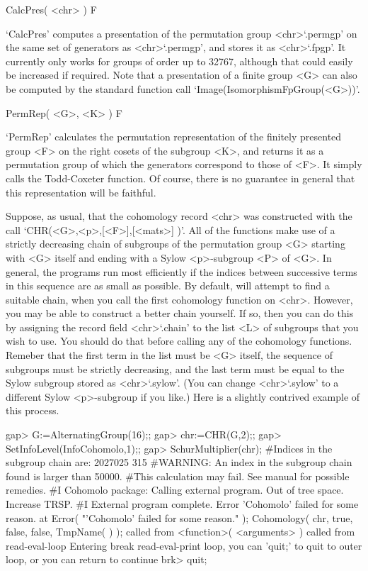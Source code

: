
\>CalcPres( <chr> ) F

`CalcPres'  computes a presentation of the permutation group <chr>`.permgp'
on the same set of generators as <chr>`.permgp', and stores it as <chr>`.fpgp'.
It currently only works for groups of order up to 32767, although that
could easily be increased if required. Note that a presentation of a
finite group <G> can also be computed by the standard {\GAP} function
call `Image(IsomorphismFpGroup(<G>))'.


\>PermRep( <G>, <K> ) F

`PermRep' calculates the permutation representation of the finitely
presented group <F> on the right cosets of the subgroup <K>, and returns
it as a permutation group of which the generators correspond to those
of <F>. It simply calls the {\GAP} Todd-Coxeter function. Of course,
there is no guarantee in general that this representation will be
faithful.


Suppose, as usual, that the cohomology record <chr> was constructed
with the call `CHR(<G>,<p>,[<F>],[<mats>] )'.
All of the functions make use of a strictly decreasing chain of subgroups
of the permutation group <G> starting with <G> itself and ending with a
Sylow <p>-subgroup <P> of <G>. In general, the programs run most efficiently
if the indices between successive terms in this sequence are as small as
possible. By default, {\GAP} will attempt to find a suitable chain, when
you call the first cohomology function on <chr>. However, you may be able
to construct a better chain yourself. If so, then you can do this
by assigning the record field <chr>`.chain' to the list <L> of subgroups
that you wish to use. You should do that before calling any of the
cohomology functions. Remeber that the first term in the list must be
<G> itself, the sequence of subgroups must be strictly decreasing,
and the last term must be equal to the Sylow subgroup stored as
<chr>`.sylow'. (You can change <chr>`.sylow' to a different Sylow
<p>-subgroup if you like.) Here is a slightly contrived example of this
process.

\beginexample
gap> G:=AlternatingGroup(16);;
gap> chr:=CHR(G,2);;
gap> SetInfoLevel(InfoCohomolo,1);;
gap> SchurMultiplier(chr);
#Indices in the subgroup chain are:  2027025 315 
#WARNING: An index in the subgroup chain found is larger than 50000.
#This calculation may fail. See manual for possible remedies.
#I   Cohomolo package: Calling external program.
Out of tree space. Increase TRSP.
#I   External program complete.
Error 'Cohomolo' failed for some reason.
 at
Error( "'Cohomolo' failed for some reason.\n" );
Cohomology( chr, true, false, false, TmpName(  ) ); called from
<function>( <arguments> ) called from read-eval-loop
Entering break read-eval-print loop, you can 'quit;' to quit to outer loop,
or you can return to continue
brk> quit;

